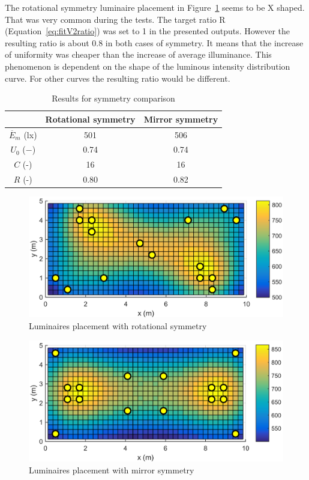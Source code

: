 The rotational symmetry luminaire placement in Figure~\ref{fig:V010_S0} seems to be X shaped. That was very common during the tests. The target ratio R (Equation~\ref{eq:fitV2ratio}) was set to 1 in the presented outputs. However the resulting ratio is about 0.8 in both cases of symmetry. It means that the increase of uniformity was cheaper than the increase of average illuminance. This phenomenon is dependent on the shape of the luminous intensity distribution curve. For other curves the resulting ratio would be different.

\begin{table}[tb]
	\renewcommand{\arraystretch}{1.3}
	\caption{Results for symmetry comparison}
 	\label{tab:symmetry}
	\centering
  \begin{tabular}{| c | c | c |}
    \hline
    & \textbf{Rotational symmetry} & \textbf{Mirror symmetry} \\
    \hline
    $\overline{E}_{m}$ (lx) & 501 & 506 \\
    \hline
		$U_0$ ($-$)& 0.74 & 0.74 \\
    \hline
		$C$ (-) & 16 & 16 \\
	\hline
		$R$ (-) & 0.80 & 0.82 \\
  \hline
  \end{tabular}
\end{table}
\begin{figure}[tb]
  \centering
  \includegraphics[width=\columnwidth]{MSTR_SLB_4x18W_5G4_Fit2_V010_S0}
  \caption{Luminaires placement with rotational symmetry}
  \label{fig:V010_S0}
\end{figure}
\begin{figure}[tb]
  \centering
  \includegraphics[width=\columnwidth]{../Vysledky/MSTR_SLB_4x18W_5G4_Fit2_V010_S1}
  \caption{Luminaires placement with mirror symmetry}
  \label{fig:V010_S1}
\end{figure}

